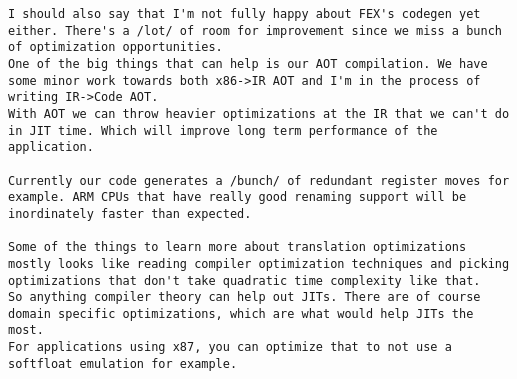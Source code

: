 \begin{Verbatim}[fontsize=\footnotesize]
I should also say that I'm not fully happy about FEX's codegen yet
either. There's a /lot/ of room for improvement since we miss a bunch
of optimization opportunities.
One of the big things that can help is our AOT compilation. We have
some minor work towards both x86->IR AOT and I'm in the process of
writing IR->Code AOT.
With AOT we can throw heavier optimizations at the IR that we can't do
in JIT time. Which will improve long term performance of the
application.

Currently our code generates a /bunch/ of redundant register moves for
example. ARM CPUs that have really good renaming support will be
inordinately faster than expected.

Some of the things to learn more about translation optimizations
mostly looks like reading compiler optimization techniques and picking
optimizations that don't take quadratic time complexity like that.
So anything compiler theory can help out JITs. There are of course
domain specific optimizations, which are what would help JITs the
most.
For applications using x87, you can optimize that to not use a
softfloat emulation for example.
\end{Verbatim}

\pagebreak